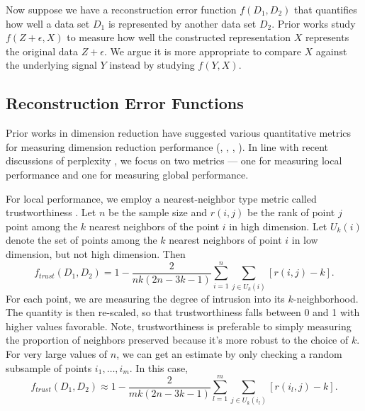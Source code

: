 \documentclass{article}
\begin{document}
\begin{center}
\end{center}

\bigbreak Now suppose we have a reconstruction error function $f(D_1, D_2)$ that quantifies how well a data set $D_1$ is represented by another data set $D_2$. Prior works study $f(Z + \epsilon, X)$ to measure how well the constructed representation $X$ represents the original data $Z + \epsilon$. We argue it is more appropriate to compare $X$ against the underlying signal $Y$ instead by studying $f(Y, X)$.

\subsection{Reconstruction Error Functions}
Prior works in dimension reduction have suggested various quantitative metrics for measuring dimension reduction performance (\cite{t-SNE cell}, \cite{quantitative survey}, \cite{rank-based criteria}, \cite{trustworthiness}). In line with recent discussions of perplexity \cite{t-SNE cell}, we focus on two metrics --- one for measuring local performance and one for measuring global performance.

\bigbreak For local performance, we employ a nearest-neighbor type metric called trustworthiness \cite{trustworthiness}. Let $n$ be the sample size and $r(i,j)$ be the rank of point $j$ point among the $k$ nearest neighbors of the point $i$ in high dimension. Let $U_k(i)$ denote the set of points among the $k$ nearest neighbors of point $i$ in low dimension, but not high dimension. Then $$f_{trust}(D_1, D_2) = 1 - \frac{2}{nk(2n - 3k - 1)}\sum_{i=1}^n \sum_{j \in U_k(i)} \left[ r(i,j) - k \right].$$ For each point, we are measuring the degree of intrusion into its $k$-neighborhood. The quantity is then re-scaled, so that trustworthiness falls between 0 and 1 with higher values favorable. Note, trustworthiness is preferable to simply measuring the proportion of neighbors preserved because it's more robust to the choice of $k$. For very large values of $n$, we can get an estimate by only checking a random subsample of points $i_1, \hdots, i_m$. In this case, $$f_{trust}(D_1, D_2) \approx 1 - \frac{2}{mk(2n - 3k - 1)}\sum_{l=1}^m \sum_{j \in U_k(i_l)} \left[ r(i_l,j) - k \right].$$
\end{document}

